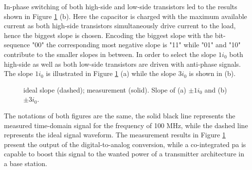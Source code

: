 \documentclass[journal]{IEEEtran}
\begin{document}
In-phase switching of both high-side and low-side transistors led to the results shown in Figure \ref{fig:meas_Output_CLoad_100M_1io_3io} (b).
Here the capacitor is charged with the maximum available current as both high-side transistors simultaneously drive current to the load, hence the biggest slope is chosen.
Encoding the biggest slope with the bit-sequence "00" the corresponding most negative slope is "11" while "01" and "10" contribute to the smaller slopes in between.
In order to select the slope $1 i_0$ both high-side as well as both low-side transistors are driven with anti-phase signals.
The slope $1 i_0$ is illustrated in Figure \ref{fig:meas_Output_CLoad_100M_1io_3io} (a) while the slope $3 i_0$ is shown in (b).
%
\begin{figure}[htb]
  \centering
	\begin{scriptsize}
  	\def\svgwidth{\columnwidth}
 	 
  	\caption{ideal slope (dashed); measurement (solid). Slope of (a) $\pm 1  i_0$ and (b) $\pm 3 i_0$.}
  	\label{fig:meas_Output_CLoad_100M_1io_3io}
	\end{scriptsize}
\end{figure}

The notations of both figures are the same, the solid black line represents the measured time-domain signal for the frequency of 100 MHz, while the dashed line represents the ideal signal waveform.
The measurement results in Figure \ref{fig:meas_Output_CLoad_100M_1io_3io} present the output of the digital-to-analog conversion, while a co-integrated \gls{pa} is capable to boost this signal to the wanted power of a transmitter architecture in a base station.


\end{document}

